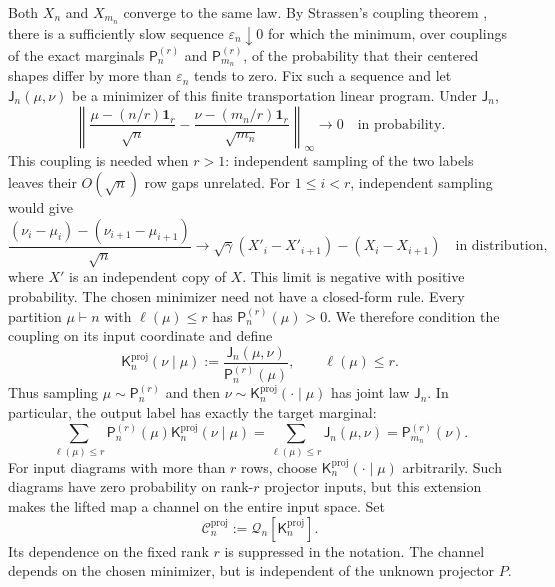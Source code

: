 \documentclass[11pt]{article}
\theoremstyle{remark}
\theoremstyle{plain}
\newcommand{\cC}{\mathcal C}
\begin{document}
Both \(X_n\) and \(X_{m_n}\) converge to the same law.  By Strassen's
coupling theorem \cite{Strassen1965}, there is a sufficiently slow
sequence \(\varepsilon_n\downarrow0\) for which the minimum, over
couplings of the exact marginals \(\mathsf P_n^{(r)}\) and
\(\mathsf P_{m_n}^{(r)}\), of the probability that their centered
shapes differ by more than \(\varepsilon_n\) tends to zero.  Fix such a
sequence and let \(\mathsf J_n(\mu,\nu)\) be a minimizer of this finite
transportation linear program.  Under \(\mathsf J_n\),
\begin{equation}
  \left\|
    \frac{\mu-(n/r)\mathbf1_r}{\sqrt n}
    -\frac{\nu-(m_n/r)\mathbf1_r}{\sqrt{m_n}}
  \right\|_\infty
  \longrightarrow0
  \quad\text{in probability}.
  \label{eq:shape-coupling}
\end{equation}
This coupling is needed when \(r>1\): independent sampling of the two
labels leaves their \(O(\sqrt n)\) row gaps unrelated.  For
\(1\le i<r\), independent sampling would give
\[
  \frac{(\nu_i-\mu_i)-(\nu_{i+1}-\mu_{i+1})}{\sqrt n}
  \longrightarrow
  \sqrt\gamma(X'_i-X'_{i+1})-(X_i-X_{i+1})
  \quad\text{in distribution},
\]
where \(X'\) is an independent copy of \(X\). This limit is negative
with positive probability.  The chosen minimizer need not have a
closed-form rule.
Every partition \(\mu\vdash n\) with \(\ell(\mu)\le r\) has
\(\mathsf P_n^{(r)}(\mu)>0\).  We therefore condition the coupling on
its input coordinate and define
\begin{equation}\label{eq:projector-label-kernel}
  \mathsf K_n^{\mathrm{proj}}(\nu\mid\mu)
  :=\frac{\mathsf J_n(\mu,\nu)}{\mathsf P_n^{(r)}(\mu)},
  \qquad \ell(\mu)\le r.
\end{equation}
Thus sampling \(\mu\sim\mathsf P_n^{(r)}\) and then
\(\nu\sim \mathsf K_n^{\mathrm{proj}}(\cdot\mid\mu)\) has joint law \(\mathsf J_n\).  In particular,
the output label has exactly the target marginal:
\begin{equation}\label{eq:projector-exact-output-marginal}
  \sum_{\ell(\mu)\le r}
    \mathsf P_n^{(r)}(\mu)\mathsf K_n^{\mathrm{proj}}(\nu\mid\mu)
  =\sum_{\ell(\mu)\le r}\mathsf J_n(\mu,\nu)
  =\mathsf P_{m_n}^{(r)}(\nu).
\end{equation}
For input diagrams with more than \(r\) rows, choose
\(\mathsf K_n^{\mathrm{proj}}(\cdot\mid\mu)\) arbitrarily.  Such diagrams have zero probability
on rank-\(r\) projector inputs, but this extension makes the lifted map a
channel on the entire input space.  Set
\begin{equation}\label{eq:projector-cloner}
  \cC_n^{\mathrm{proj}}:=\mathcal Q_n[\mathsf K_n^{\mathrm{proj}}].
\end{equation}
Its dependence on the fixed rank \(r\) is suppressed in the notation.
The channel depends on the chosen minimizer, but
is independent of the unknown projector \(P\).
\end{document}
